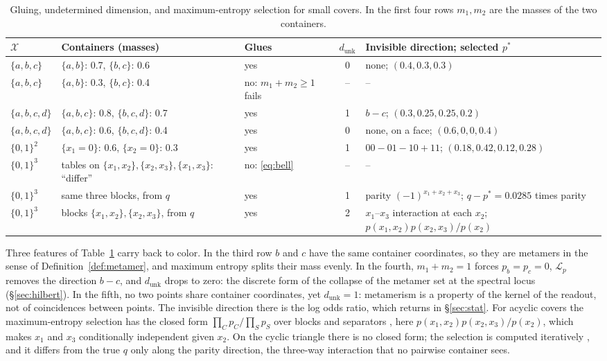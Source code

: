 \documentclass[11pt]{article}
\theoremstyle{boldplain}
\theoremstyle{boldupright}
\newcommand{\Xs}{\mathcal{X}}
\newcommand{\dunk}{d_{\mathrm{unk}}}
\begin{document}
\begin{table}[t]
\centering\small
\begin{tabularx}{\textwidth}{@{}>{\raggedright}p{0.62in} >{\raggedright}p{1.7in} >{\raggedright}p{1.2in} c >{\raggedright\arraybackslash}X@{}}
\toprule
$\Xs$ & Containers (masses) & Glues & $\dunk$ & Invisible direction; selected $p^*$\\
\midrule
$\{a,b,c\}$ & $\{a,b\}$: 0.7, $\{b,c\}$: 0.6 & yes & 0 & none; $(0.4,0.3,0.3)$\\
$\{a,b,c\}$ & $\{a,b\}$: 0.3, $\{b,c\}$: 0.4 & no: $m_1+m_2\ge1$ fails & -- & --\\
$\{a,b,c,d\}$ & $\{a,b,c\}$: 0.8, $\{b,c,d\}$: 0.7 & yes & 1 & $b-c$; $(0.3,0.25,0.25,0.2)$\\
$\{a,b,c,d\}$ & $\{a,b,c\}$: 0.6, $\{b,c,d\}$: 0.4 & yes & 0 & none, on a face; $(0.6,0,0,0.4)$\\
$\{0,1\}^2$ & $\{x_1=0\}$: 0.6, $\{x_2=0\}$: 0.3 & yes & 1 & $00-01-10+11$; $(0.18,0.42,0.12,0.28)$\\
$\{0,1\}^3$ & tables on $\{x_1,x_2\},\{x_2,x_3\},\{x_1,x_3\}$: ``differ'' & no: \eqref{eq:bell} & -- & --\\
$\{0,1\}^3$ & same three blocks, from $q$ & yes & 1 & parity $(-1)^{x_1+x_2+x_3}$; $q-p^*=0.0285$ times parity\\
$\{0,1\}^3$ & blocks $\{x_1,x_2\},\{x_2,x_3\}$, from $q$ & yes & 2 & $x_1$--$x_3$ interaction at each $x_2$; $p(x_1,x_2)p(x_2,x_3)/p(x_2)$\\
\bottomrule
\end{tabularx}
\caption{Gluing, undetermined dimension, and maximum-entropy selection for small covers. In the first four rows $m_1,m_2$ are the masses of the two containers.}
\label{tab:worked}
\end{table}

Three features of Table~\ref{tab:worked} carry back to color. In the third row $b$ and $c$ have the same container
coordinates, so they are metamers in the sense of Definition~\ref{def:metamer}, and maximum entropy splits their mass
evenly. In the fourth, $m_1+m_2=1$ forces $p_b=p_c=0$, $\mathcal{L}_p$ removes the direction $b-c$, and $\dunk$ drops to zero:
the discrete form of the collapse of the metamer set at the spectral locus (\S\ref{sec:hilbert}). In the fifth, no two points
share container coordinates, yet $\dunk=1$: metamerism is a property of the kernel of the readout, not of
coincidences between points. The invisible direction there is the log odds ratio, which returns in \S\ref{sec:stat}.
For acyclic covers the maximum-entropy selection has the closed form $\prod_Cp_C/\prod_Sp_S$ over blocks and
separators \cite{lauritzen1996}, here $p(x_1,x_2)p(x_2,x_3)/p(x_2)$, which makes $x_1$ and $x_3$ conditionally independent given $x_2$.
On the cyclic triangle there is no closed form; the selection is computed iteratively \cite{deming1940}, and it differs from
the true $q$ only along the parity direction, the three-way interaction that no pairwise container sees.
\end{document}
